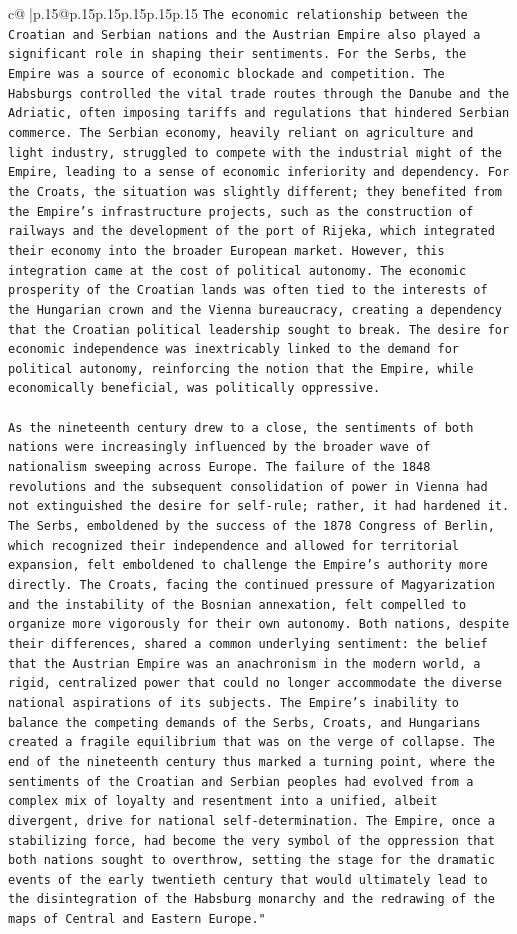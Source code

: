 \documentclass{article}
\begin{document}
{\begin{supertabular}{c@{$\;$}|p{.15\linewidth}@{}p{.15\linewidth}p{.15\linewidth}p{.15\linewidth}p{.15\linewidth}p{.15\linewidth}}
{{{\texttt{The economic relationship between the Croatian and Serbian nations and the Austrian Empire also played a significant role in shaping their sentiments. For the Serbs, the Empire was a source of economic blockade and competition. The Habsburgs controlled the vital trade routes through the Danube and the Adriatic, often imposing tariffs and regulations that hindered Serbian commerce. The Serbian economy, heavily reliant on agriculture and light industry, struggled to compete with the industrial might of the Empire, leading to a sense of economic inferiority and dependency. For the Croats, the situation was slightly different; they benefited from the Empire's infrastructure projects, such as the construction of railways and the development of the port of Rijeka, which integrated their economy into the broader European market. However, this integration came at the cost of political autonomy. The economic prosperity of the Croatian lands was often tied to the interests of the Hungarian crown and the Vienna bureaucracy, creating a dependency that the Croatian political leadership sought to break. The desire for economic independence was inextricably linked to the demand for political autonomy, reinforcing the notion that the Empire, while economically beneficial, was politically oppressive.} \\
\\ 
\texttt{As the nineteenth century drew to a close, the sentiments of both nations were increasingly influenced by the broader wave of nationalism sweeping across Europe. The failure of the 1848 revolutions and the subsequent consolidation of power in Vienna had not extinguished the desire for self{-}rule; rather, it had hardened it. The Serbs, emboldened by the success of the 1878 Congress of Berlin, which recognized their independence and allowed for territorial expansion, felt emboldened to challenge the Empire's authority more directly. The Croats, facing the continued pressure of Magyarization and the instability of the Bosnian annexation, felt compelled to organize more vigorously for their own autonomy. Both nations, despite their differences, shared a common underlying sentiment: the belief that the Austrian Empire was an anachronism in the modern world, a rigid, centralized power that could no longer accommodate the diverse national aspirations of its subjects. The Empire's inability to balance the competing demands of the Serbs, Croats, and Hungarians created a fragile equilibrium that was on the verge of collapse. The end of the nineteenth century thus marked a turning point, where the sentiments of the Croatian and Serbian peoples had evolved from a complex mix of loyalty and resentment into a unified, albeit divergent, drive for national self{-}determination. The Empire, once a stabilizing force, had become the very symbol of the oppression that both nations sought to overthrow, setting the stage for the dramatic events of the early twentieth century that would ultimately lead to the disintegration of the Habsburg monarchy and the redrawing of the maps of Central and Eastern Europe."} \\
}}}
\end{supertabular}}
\end{document}
